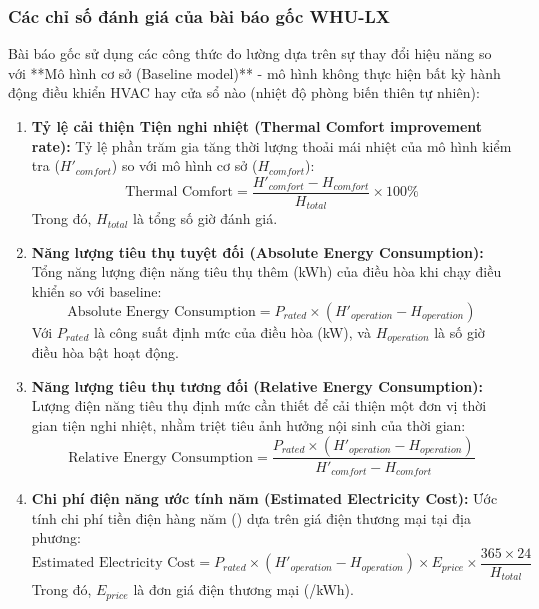 \documentclass[12pt, a4paper]{report}
\begin{document}
\subsubsection{Các chỉ số đánh giá của bài báo gốc WHU-LX}
Bài báo gốc sử dụng các công thức đo lường dựa trên sự thay đổi hiệu năng so với **Mô hình cơ sở (Baseline model)** - mô hình không thực hiện bất kỳ hành động điều khiển HVAC hay cửa sổ nào (nhiệt độ phòng biến thiên tự nhiên):
\begin{enumerate}
    \item \textbf{Tỷ lệ cải thiện Tiện nghi nhiệt (Thermal Comfort improvement rate):} Tỷ lệ phần trăm gia tăng thời lượng thoải mái nhiệt của mô hình kiểm tra ($H'_{comfort}$) so với mô hình cơ sở ($H_{comfort}$):
    \begin{equation}
    \text{Thermal Comfort} = \frac{H'_{comfort} - H_{comfort}}{H_{total}} \times 100\%
    \end{equation}
    Trong đó, $H_{total}$ là tổng số giờ đánh giá.
    
    \item \textbf{Năng lượng tiêu thụ tuyệt đối (Absolute Energy Consumption):} Tổng năng lượng điện năng tiêu thụ thêm (kWh) của điều hòa khi chạy điều khiển so với baseline:
    \begin{equation}
    \text{Absolute Energy Consumption} = P_{rated} \times (H'_{operation} - H_{operation})
    \end{equation}
    Với $P_{rated}$ là công suất định mức của điều hòa (kW), và $H_{operation}$ là số giờ điều hòa bật hoạt động.
    
    \item \textbf{Năng lượng tiêu thụ tương đối (Relative Energy Consumption):} Lượng điện năng tiêu thụ định mức cần thiết để cải thiện một đơn vị thời gian tiện nghi nhiệt, nhằm triệt tiêu ảnh hưởng nội sinh của thời gian:
    \begin{equation}
    \text{Relative Energy Consumption} = \frac{P_{rated} \times (H'_{operation} - H_{operation})}{H'_{comfort} - H_{comfort}}
    \end{equation}
    
    \item \textbf{Chi phí điện năng ước tính năm (Estimated Electricity Cost):} Ước tính chi phí tiền điện hàng năm (\text{\$}) dựa trên giá điện thương mại tại địa phương:
    \begin{equation}
    \text{Estimated Electricity Cost} = P_{rated} \times (H'_{operation} - H_{operation}) \times E_{price} \times \frac{365 \times 24}{H_{total}}
    \end{equation}
    Trong đó, $E_{price}$ là đơn giá điện thương mại (\text{\$}/kWh).
\end{enumerate}
\end{document}
